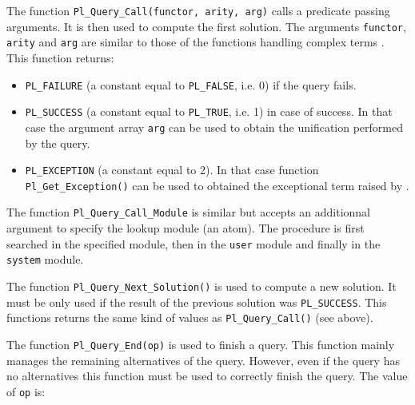The function \texttt{Pl\_Query\_Call(functor, arity, arg)} calls a predicate
passing arguments. It is then used to compute the first solution. The
arguments \texttt{functor}, \texttt{arity} and \texttt{arg} are similar to
those of the functions handling complex terms
. This function returns:

\begin{itemize}

\item \texttt{PL\_FAILURE} (a constant equal to \texttt{PL\_FALSE}, i.e. 0) if
the query fails.

\item \texttt{PL\_SUCCESS} (a constant equal to \texttt{PL\_TRUE}, i.e. 1) in
case of success. In that case the argument array \texttt{arg} can be used to
obtain the unification performed by the query.

\item \texttt{PL\_EXCEPTION} (a constant equal to 2). In that case function
\texttt{Pl\_Get\_Exception()} can be used to obtained the exceptional term
raised by  .

\end{itemize}

The function \texttt{Pl\_Query\_Call\_Module} is similar but accepts an
additionnal argument to specify the lookup module (an atom). The procedure is
first searched in the specified module, then in the \texttt{user} module and
finally in the \texttt{system} module.

The function \texttt{Pl\_Query\_Next\_Solution()} is used to compute a new
solution. It must be only used if the result of the previous solution was
\texttt{PL\_SUCCESS}. This functions returns the same kind of values as
\texttt{Pl\_Query\_Call()} (see above).

The function \texttt{Pl\_Query\_End(op)} is used to finish a query. This
function mainly manages the remaining alternatives of the query. However,
even if the query has no alternatives this function must be used to
correctly finish the query. The value of \texttt{op} is:

